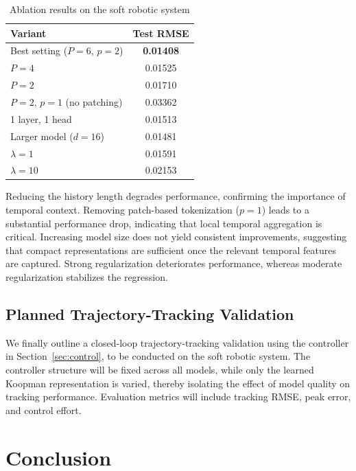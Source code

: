 \documentclass[journal]{IEEEtran}
\begin{document}
\begin{table}[!t]
\renewcommand{\arraystretch}{1.2}
\caption{Ablation results on the soft robotic system}
\label{tab:ablation_platform_b}
\centering
\begin{tabular}{p{}c}
\toprule
Variant & Test RMSE \\
\midrule
Best setting ($P=6$, $p=2$) & \textbf{0.01408} \\
$P=4$ & 0.01525 \\
$P=2$ & 0.01710 \\
$P=2$, $p=1$ (no patching) & 0.03362 \\
1 layer, 1 head & 0.01513 \\
Larger model ($d=16$) & 0.01481 \\
$\lambda=1$ & 0.01591 \\
$\lambda=10$ & 0.02153 \\
\bottomrule
\end{tabular}
\end{table}

Reducing the history length degrades performance, confirming the importance of temporal context. Removing patch-based tokenization ($p=1$) leads to a substantial performance drop, indicating that local temporal aggregation is critical. Increasing model size does not yield consistent improvements, suggesting that compact representations are sufficient once the relevant temporal features are captured. Strong regularization deteriorates performance, whereas moderate regularization stabilizes the regression.

\subsection{Planned Trajectory-Tracking Validation}

We finally outline a closed-loop trajectory-tracking validation using the controller in Section~\ref{sec:control}, to be conducted on the soft robotic system. The controller structure will be fixed across all models, while only the learned Koopman representation is varied, thereby isolating the effect of model quality on tracking performance. Evaluation metrics will include tracking RMSE, peak error, and control effort.

\section{Conclusion}
\label{sec:conclusion}
\end{document}
